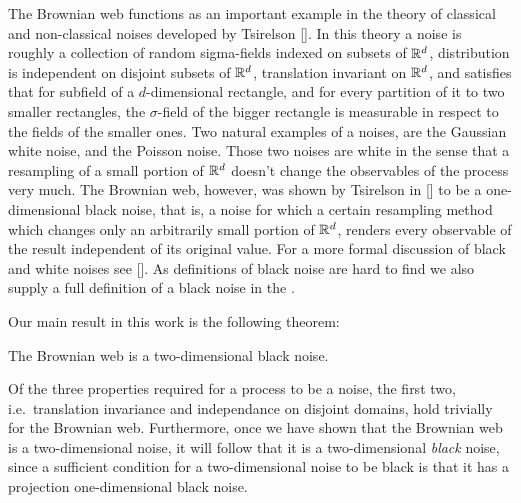 {The Brownian web functions as an important example in the theory of classical
and non-classical noises developed by Tsirelson []. In this theory a noise is
roughly a collection of random sigma-fields indexed on subsets of $\mathbb{R}^d$,
distribution is independent on disjoint subsets of $\mathbb{R}^d$, translation
invariant on $\mathbb{R}^d$, and satisfies that for subfield of a $d$-dimensional
rectangle, and for every partition of it to two smaller rectangles, the $\sigma$-field
of the bigger rectangle is measurable in respect to the fields of the
smaller ones. Two natural examples of a noises, are the Gaussian white noise,
and the Poisson noise. Those two noises are white in the sense that a
resampling of a small portion of $\mathbb{R}^d$ doesn't change the observables of the
process very much. The Brownian web, however, was shown by Tsirelson in [] to
be a one-dimensional black noise, that is, a noise for which a certain
resampling method which changes only an arbitrarily small portion of $\mathbb{R}^d$,
renders every observable of the result independent of its original value. For
a more formal discussion of black and white noises see []. As definitions of
black noise are hard to find we also supply a full definition of a black
noise in the .

Our main result in this work is the following theorem:

\begin{theorem}
\label{thm:bw-2d-black-noise}
The Brownian web is a
two-dimensional black noise.
\end{theorem}

Of the three properties required for a process to be a noise, the
first two, i.e.\ translation invariance and independance on disjoint
domains, hold trivially for the Brownian web.  Furthermore, once we
have shown that the Brownian web is a two-dimensional noise, it will
follow that it is a two-dimensional \emph{black} noise, since a
sufficient condition for a two-dimensional noise to be black is that
it has a projection one-dimensional black noise.




}
